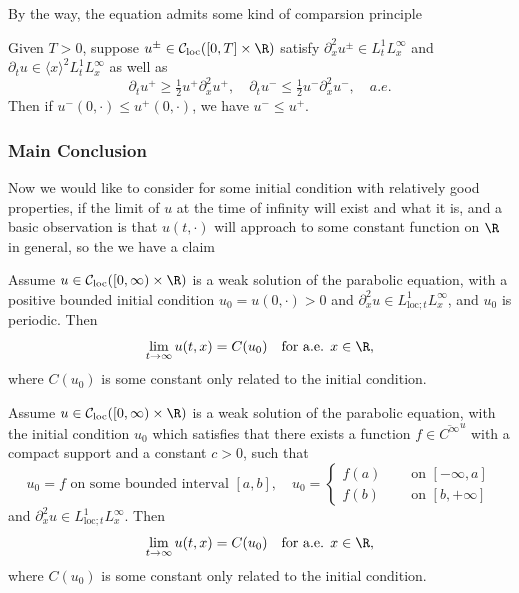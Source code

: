 By the way, the equation admits some kind of comparsion principle

\begin{proposition}
    Given $T > 0$, suppose $u^{\pm}\in \mathcal{C}_{\text{loc}}([0,T]\times \R)$ satisfy $\partial_x^2 u^{\pm} \in L^1_tL^{\infty}_x$ and $\partial_t u \in \langle x\rangle^2L^1_tL^{\infty}_x$ as well as
    \[
    \partial_t u^+ \geq \tfrac12 u^+\partial_x^2 u^+,\quad \partial_t u^- \leq \tfrac12 u^-\partial_x^2 u^-, \quad a.e.
    \]
    Then if $u^-(0,\cdot) \leq u^+(0,\cdot)$, we have $u^- \leq u^+$.
\end{proposition}

\subsubsection{Main Conclusion}

Now we would like to consider for some initial condition with relatively good properties, if the limit of $u$ at the time of infinity will exist and what it is, and a basic observation is that $u(t,\cdot)$ will approach to some constant function on $\R$ in general, so the we have a claim

\begin{theorem}
    Assume $u \in \mathcal{C}_{\text{loc}}([0,\infty)\times\R)$ is a weak solution of the parabolic equation, with a positive bounded initial condition $u_0 = u(0,\cdot) > 0$ and $\partial^2_x u \in L_{\text{loc};t}^1L_x^{\infty}$, and $u_0$ is periodic. Then \[\lim_{t\to \infty}u(t,x) = C(u_0)\quad\text{for a.e. }x\in\R,\] where $C(u_0)$ is some constant only related to the initial condition.  
\end{theorem}
\begin{theorem}
    Assume $u \in \mathcal{C}_{\text{loc}}([0,\infty)\times\R)$ is a weak solution of the parabolic equation, with the initial condition $u_0$ which satisfies that there exists a function $f \in \overline{C^{\infty}}^{u}$ with a compact support and a constant $c > 0$, such that
    \[
    u_0 = f\text{ on some bounded interval }[a,b],\quad u_0 =\begin{cases}
         f(a)\quad &\text{ on }[-\infty, a] \\
         f(b)&\text{ on }[b,+\infty]
    \end{cases}
    \]
    and $\partial^2_x u \in L_{\text{loc};t}^1L_x^{\infty}$. Then \[\lim_{t\to \infty}u(t,x) = C(u_0)\quad\text{for a.e. }x\in\R,\] where $C(u_0)$ is some constant only related to the initial condition.
\end{theorem}

